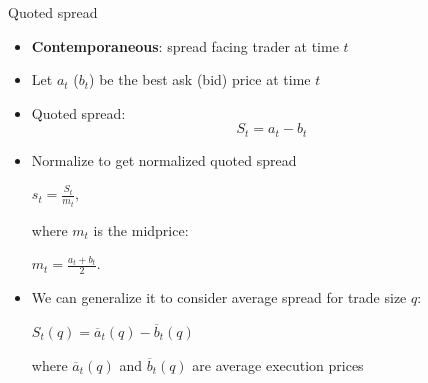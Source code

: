 \documentclass[english,10pt]{beamer}
\begin{document}


\begin{frame}{Quoted spread}
	\begin{itemize}
		\item \textbf{Contemporaneous}: spread facing trader at time $t$
		\item Let $a_t$ ($b_t$) be the best ask (bid) price at time $t$
		\item \alert{Quoted spread}:
		\begin{equation*}
			S_t = a_t -b_t
		\end{equation*}
		\item \pause Normalize to get \alert{normalized quoted spread}
		\begin{center}
			$
			s_t = \frac{S_t}{m_t},
			$
		\end{center}
		where $m_t$ is the midprice:
		\begin{center}
			$
			m_t = \frac{a_t+b_t}{2}.
			$
		\end{center}
		\pause
		\item We can generalize it to consider average spread for trade size $q$: 
		\begin{center}$S_t(q)=\overline{a}_t(q)-\overline{b}_t(q)$\end{center}
		where $\overline{a}_t(q)$ and $\overline{b}_t(q)$ are average execution prices
	\end{itemize}
\end{frame}
\end{document}
